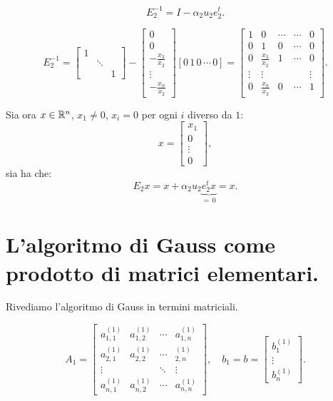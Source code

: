 \begin{ese}
\[E_2^{-1} = I -\alpha_2u_2e_2^t.
\]

\[
E_2^{-1}  =
\left[\begin{array}{ccc}
1 & & \\
 & \ddots & \\
& & 1
\end{array}\right] -
\left[\begin{array}{c}
0 \\
0 \\
-\frac{x_3}{x_2} \\
\vdots \\
-\frac{x_n}{x_2}
\end{array}\right] \left[ 0\, 1\, 0\, \cdots\, 0\right] =
\left[\begin{array}{ccccc}
1 & 0 &\cdots  &\cdots & 0 \\
0 & 1 & 0 & \cdots & 0 \\
0 &\frac{x_3}{x_2} & 1  & \cdots & 0 \\
\vdots & \vdots & & &\vdots \\
0 &\frac{x_n}{x_2} & 0 &\cdots &1
\end{array}\right].
\]
\begin{osse}
Sia ora $x \in \mathbb{R}^n$, $x_1 \neq 0$, $x_i = 0$ per ogni $i$ diverso da $1$:
\[x = \left[\begin{array}{c}x_1 \\ 0 \\ \vdots \\ 0 \end{array}\right],\]
sia ha che: \[E_2x = x +\alpha_2u_2\underbrace{e_2^tx}_{ =\, 0 } = x.\]
\end{osse}
\end{ese}

\section{L'algoritmo di Gauss come prodotto di matrici elementari.}
\label{E-to-Gauss}
Rivediamo l'algoritmo di Gauss in termini matriciali.

\[
A_1 = \left[
\begin{array}{cccc}
a_{1,1}^{(1)} & a_{1,2}^{(1)} & \cdots & a_{1,n}^{(1)} \\
a_{2,1}^{(1)} & a_{2,2}^{(1)}& \cdots & _{2,n}^{(1)} \\
\vdots & &\ddots & \vdots \\
a_{n,1}^{(1)}& a_{n,2}^{(1)} & \cdots & a_{n,n}^{(1)}
\end{array} \right],
\quad
b_1 = b = \left[ \begin{array}{c}
b_{1}^{(1)} \\
\vdots \\
b_{n}^{(1)}
\end{array}\right].
\]

